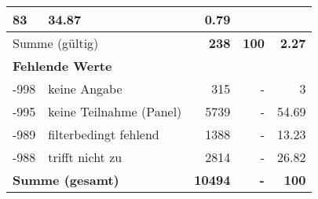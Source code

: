\begin{longtable}{lXrrr}
       \num{83} &
       \num[round-mode=places,round-precision=2]{34,87} &
         \num[round-mode=places,round-precision=2]{0,79} \\
     \midrule
     \multicolumn{2}{l}{Summe (gültig)} &
       \textbf{\num{238}} &
     \textbf{100} &
       \textbf{\num[round-mode=places,round-precision=2]{2,27}} \\
     \multicolumn{5}{l}{\textbf{Fehlende Werte}}\\
       -998 &
       keine Angabe &
         \num{315} &
        - &
         \num[round-mode=places,round-precision=2]{3} \\
       -995 &
       keine Teilnahme (Panel) &
         \num{5739} &
        - &
         \num[round-mode=places,round-precision=2]{54,69} \\
       -989 &
       filterbedingt fehlend &
         \num{1388} &
        - &
         \num[round-mode=places,round-precision=2]{13,23} \\
       -988 &
       trifft nicht zu &
         \num{2814} &
        - &
         \num[round-mode=places,round-precision=2]{26,82} \\
     \midrule
     \multicolumn{2}{l}{\textbf{Summe (gesamt)}} &
          \textbf{\num{10494}} &
        \textbf{-} &
        \textbf{100} \\
     \bottomrule
     \end{longtable}
     
